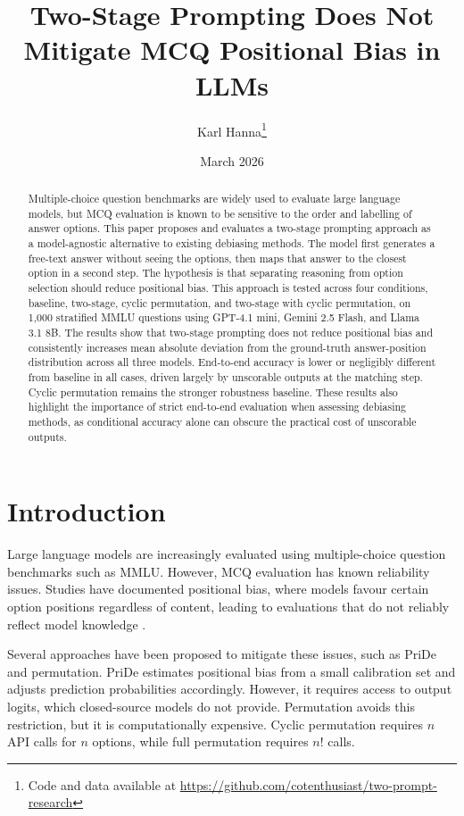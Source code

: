 \documentclass{article}
\title{Two-Stage Prompting Does Not Mitigate MCQ Positional Bias in LLMs}
\author{Karl Hanna\thanks{Code and data available at \url{https://github.com/cotenthusiast/two-prompt-research}}}
\date{March 2026}
\begin{document}
\maketitle
 
\begin{abstract}
Multiple-choice question benchmarks are widely used to evaluate large language models, but MCQ evaluation is known to be sensitive to the order and labelling of answer options. This paper proposes and evaluates a two-stage prompting approach as a model-agnostic alternative to existing debiasing methods. The model first generates a free-text answer without seeing the options, then maps that answer to the closest option in a second step. The hypothesis is that separating reasoning from option selection should reduce positional bias. This approach is tested across four conditions, baseline, two-stage, cyclic permutation, and two-stage with cyclic permutation, on 1,000 stratified MMLU questions using GPT-4.1 mini, Gemini 2.5 Flash, and Llama 3.1 8B. The results show that two-stage prompting does not reduce positional bias and consistently increases mean absolute deviation from the ground-truth answer-position distribution across all three models. End-to-end accuracy is lower or negligibly different from baseline in all cases, driven largely by unscorable outputs at the matching step. Cyclic permutation remains the stronger robustness baseline. These results also highlight the importance of strict end-to-end evaluation when assessing debiasing methods, as conditional accuracy alone can obscure the practical cost of unscorable outputs.
\end{abstract}
 
\section{Introduction}
Large language models are increasingly evaluated using multiple-choice question benchmarks such as MMLU. However, MCQ evaluation has known reliability issues. Studies have documented positional bias, where models favour certain option positions regardless of content, leading to evaluations that do not reliably reflect model knowledge \cite{pezeshkpour-hruschka-2024-large}.
 
Several approaches have been proposed to mitigate these issues, such as PriDe \cite{zheng2023large} and permutation. PriDe estimates positional bias from a small calibration set and adjusts prediction probabilities accordingly. However, it requires access to output logits, which closed-source models do not provide. Permutation avoids this restriction, but it is computationally expensive. Cyclic permutation requires $n$ API calls for $n$ options, while full permutation requires $n!$ calls.
 
\end{document}
